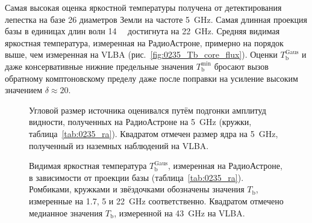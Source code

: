 Самая высокая оценка яркостной температуры получена от детектирования лепестка на базе 26 диаметров
Земли на частоте \SI{5}{\GHz}. Самая длинная проекция базы в единицах длин волн \SI{14}{\giga\la}
достигнута на \SI{22}{\GHz}. Средняя видимая яркостная температура, измеренная на РадиоАстроне,
примерно на порядок выше, чем измеренная на VLBA (рис.~\ref{fig:0235_Tb_core_flux}). Оценки
$T_\text{b}^\text{Gaus}$ и даже консервативные нижние предельные значения $T_\text{b}^\text{min}$
бросают вызов обратному комптоновскому пределу даже после поправки на усиление высоким значением
$\delta \approx 20$.

\begin{figure}[tbh]
\caption{Угловой размер источника оценивался путём подгонки амплитуд видности, полученных на
РадиоАстроне на \SI{5}{\GHz} (кружки, таблица~\ref{tab:0235_ra}). Квадратом отмечен размер ядра на
\SI{5}{\GHz}, полученный из наземных наблюдений на VLBA.}
\label{fig:0235_size_ra}
\end{figure}

\begin{figure}[tbh]
\caption{Видимая яркостная температура $T_\text{b}^\text{Gaus}$, измеренная на РадиоАстроне, в
зависимости от проекции базы (таблица~\ref{tab:0235_ra}). Ромбиками, кружками и звёздочками
обозначены значения $T_\text{b}$, измеренные на 1.7, 5 и \SI{22}{\GHz} соответственно. Квадратом
отмечено медианное значения $T_\text{b}$, измеренной на \SI{43}{\GHz} на VLBA.}
\label{fig:0235_tb_ra}
\end{figure}

